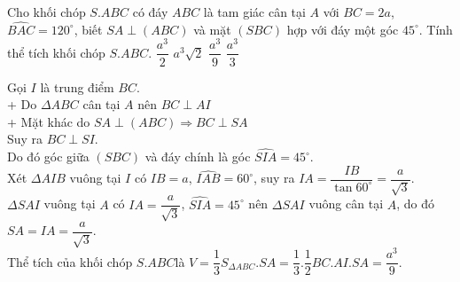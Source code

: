 \begin{ex}%
Cho khối chóp $ S.ABC$ có đáy $ ABC$ là tam giác cân tại $ A$ với $ BC=2a$, $\widehat{BAC}=120^\circ $, biết $ SA\perp (ABC)$ và mặt $ (SBC)$ hợp với đáy một góc $ 45^\circ $. Tính thể tích khối chóp $ S.ABC$.
\choice
{$\dfrac{a^3}{2}$}
{$a^3\sqrt{2}$}
{\True $\dfrac{a^3}{9}$}
{$\dfrac{a^3}{3}$}
\loigiai
{
\begin{center}
\end{center}
Gọi $ I$ là trung điểm $ BC$.\\
+ Do $\Delta ABC$ cân tại $ A$ nên $ BC\perp AI$\\
+ Mặt khác do $SA\perp (ABC)\Rightarrow BC\perp SA$\\
Suy ra $ BC\perp SI$.\\
Do đó góc giữa $ (SBC)$ và đáy chính là góc $\widehat{SIA}=45^\circ $.\\
 Xét $\Delta AIB$ vuông tại $ I$ có $ IB=a$, $\widehat{IAB}=60^\circ $, suy ra $ IA=\dfrac{IB}{\tan 60^\circ}=\dfrac{a}{\sqrt{3}}$.\\
$\Delta SAI$ vuông tại $ A$ có $ IA=\dfrac{a}{\sqrt{3}}$, $\widehat{SIA}=45^\circ $ nên $\Delta SAI$ vuông cân tại $ A$, do đó $ SA=IA=\dfrac{a}{\sqrt{3}}$.\\
 Thể tích của khối chóp $ S.ABC$là $ V=\dfrac{1}{3}{S_{\Delta ABC}}.SA=\dfrac{1}{3}.\dfrac{1}{2}BC.AI.SA=\dfrac{a^3}{9}$.}
\end{ex}

